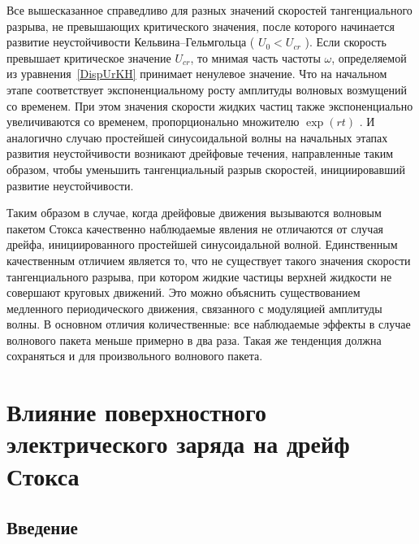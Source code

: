  Все вышесказанное справедливо для разных значений скоростей тангенциального разрыва, не превышающих критического значения, после которого начинается развитие неустойчивости Кельвина--Гельмгольца ( $ U_{0}<U_{cr} $ ). Если скорость превышает критическое значение  $ U_{cr} $, то мнимая часть частоты  $ \omega $, определяемой из уравнения~\eqref{DispUrKH} принимает ненулевое значение. Что на начальном этапе соответствует экспоненциальному росту амплитуды волновых возмущений со временем. При этом значения скорости жидких частиц также экспоненциально увеличиваются со временем, пропорционально множителю $ \exp\left( r t \right) $ . И аналогично случаю простейшей синусоидальной волны на начальных этапах развития неустойчивости возникают дрейфовые течения, направленные таким образом, чтобы уменьшить тангенциальный разрыв скоростей, инициировавший развитие неустойчивости.

Таким образом в случае, когда дрейфовые движения вызываются волновым пакетом Стокса качественно наблюдаемые явления не отличаются от случая дрейфа, инициированного простейшей синусоидальной волной. Единственным качественным отличием является то, что не существует такого значения скорости тангенциального разрыва, при котором жидкие частицы верхней жидкости не совершают круговых движений. Это можно объяснить существованием медленного периодического движения, связанного с модуляцией амплитуды волны. В основном отличия количественные: все наблюдаемые эффекты в случае волнового пакета меньше примерно в два раза. Такая же тенденция должна сохраняться и для произвольного волнового пакета.

\section{Влияние поверхностного электрического заряда на дрейф Стокса}\label{sec:TF}
\subsection{Введение}

